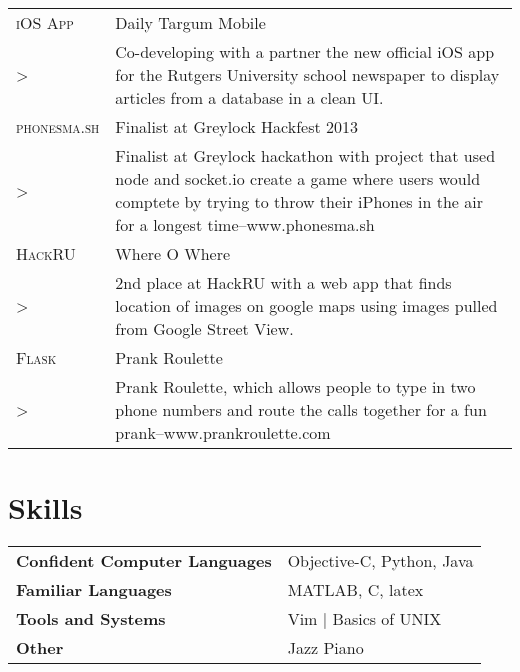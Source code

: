 \documentclass[a4paper, oneside, final]{scrartcl} %
\newcommand{\gray}{\rowcolor[gray]{.90}} %
\begin{document}
\begin{center}
\begin{tabularx}{0.97\linewidth}{>{\raggedleft\scshape}p{2.0cm}X}
    \gray iOS App & Daily Targum Mobile\\
  >& Co-developing with a partner the new official iOS app for the Rutgers University school newspaper to display articles from a database in a clean UI. \\
    \gray phonesma.sh & Finalist at Greylock Hackfest 2013\\
  >& Finalist at Greylock hackathon with project that used node and socket.io create a game where users would comptete by trying to throw their iPhones in the air for a longest time--www.phonesma.sh\\
    \gray HackRU & Where O Where \\
  >& 2nd place at HackRU with a web app that finds location of images on google maps using images pulled from Google Street View. \\
    \gray Flask  & Prank Roulette\\
  >& Prank Roulette, which allows people to type in two phone numbers and route the calls together for a fun prank--www.prankroulette.com \\
\end{tabularx}



\section{Skills}

\begin{tabular}{@{} >{\bfseries}l @{\hspace{4ex}} l }
Confident Computer Languages & Objective-C, Python, Java\\
Familiar Languages & MATLAB, C, latex  \\
Tools and Systems & Vim | Basics of UNIX \\
Other & Jazz Piano
\end{tabular}


\end{center}
\end{document}
